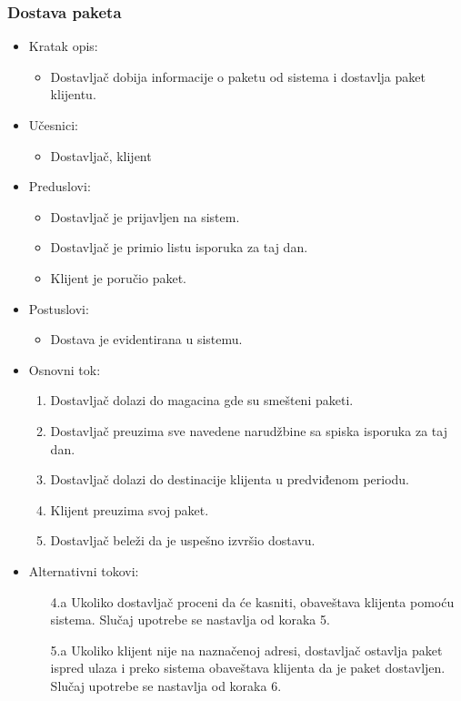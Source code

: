 
\subsubsection{Dostava paketa}

	\begin{itemize}
		\item{Kratak opis:} 
		\begin{itemize}
			\item{Dostavljač dobija informacije o paketu od sistema i dostavlja paket klijentu.}
		\end{itemize}
		
		\item{Učesnici:} 
		\begin{itemize}
			\item{Dostavljač, klijent}
		\end{itemize}		
		
		\item{Preduslovi:}
		\begin{itemize}
			\item{Dostavljač je prijavljen na sistem.}
			\item{Dostavljač je primio listu isporuka za taj dan.}
			\item{Klijent je poručio paket.}
		\end{itemize}		

		\item{Postuslovi:}
		\begin{itemize}
			\item{Dostava je evidentirana u sistemu.}
		\end{itemize}		
		
		\item{Osnovni tok:}
		\begin{enumerate}
			\item{Dostavljač dolazi do magacina gde su smešteni paketi.}
			\item{Dostavljač preuzima sve navedene narudžbine sa spiska isporuka za taj dan.}
			\item{Dostavljač dolazi do destinacije klijenta u predviđenom periodu.}
			\item{Klijent preuzima svoj paket.}
			\item{Dostavljač beleži da je uspešno izvršio dostavu.}
			
		\end{enumerate}
		
		\item{Alternativni tokovi:}
			\begin{enumerate}
				\item[4.a] Ukoliko dostavljač proceni da će kasniti, obaveštava klijenta pomoću sistema. Slučaj upotrebe se nastavlja od koraka 5.
				\item[5.a] Ukoliko klijent nije na naznačenoj adresi, dostavljač ostavlja paket ispred ulaza i preko sistema obaveštava klijenta da je paket dostavljen. Slučaj upotrebe se nastavlja od koraka 6.
			\end{enumerate}
	\end{itemize}
